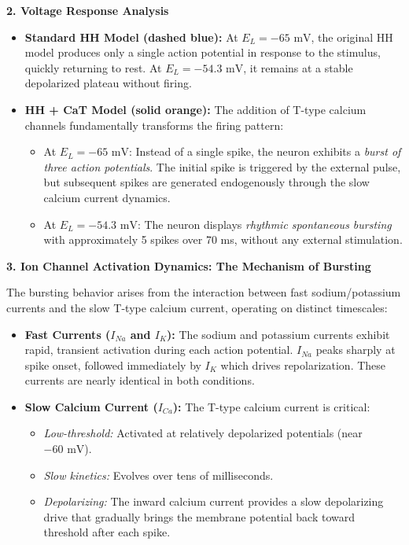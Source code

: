 \documentclass{article}
\begin{document}
\begin{answerbox}
\textbf{2. Voltage Response Analysis}
\begin{itemize}
    \item \textbf{Standard HH Model (dashed blue):} At $E_L = -65 \text{ mV}$, the original HH model produces only a single action potential in response to the stimulus, quickly returning to rest. At $E_L = -54.3 \text{ mV}$, it remains at a stable depolarized plateau without firing.
    \item \textbf{HH + CaT Model (solid orange):} The addition of T-type calcium channels fundamentally transforms the firing pattern:
    \begin{itemize}
        \item At $E_L = -65 \text{ mV}$: Instead of a single spike, the neuron exhibits a \textit{burst of three action potentials}. The initial spike is triggered by the external pulse, but subsequent spikes are generated endogenously through the slow calcium current dynamics.
        \item At $E_L = -54.3 \text{ mV}$: The neuron displays \textit{rhythmic spontaneous bursting} with approximately 5 spikes over 70 ms, without any external stimulation.
    \end{itemize}
\end{itemize}

\textbf{3. Ion Channel Activation Dynamics: The Mechanism of Bursting}

The bursting behavior arises from the interaction between fast sodium/potassium currents and the slow T-type calcium current, operating on distinct timescales:
\begin{itemize}
    \item \textbf{Fast Currents ($I_{Na}$ and $I_{K}$):} The sodium and potassium currents exhibit rapid, transient activation during each action potential. $I_{Na}$ peaks sharply at spike onset, followed immediately by $I_{K}$ which drives repolarization. These currents are nearly identical in both conditions.
    \item \textbf{Slow Calcium Current ($I_{Ca}$):} The T-type calcium current is critical:
    \begin{itemize}
        \item \textit{Low-threshold:} Activated at relatively depolarized potentials (near $-60 \text{ mV}$).
        \item \textit{Slow kinetics:} Evolves over tens of milliseconds.
        \item \textit{Depolarizing:} The inward calcium current provides a slow depolarizing drive that gradually brings the membrane potential back toward threshold after each spike.
    \end{itemize}
\end{itemize}


\end{answerbox}
\end{document}
